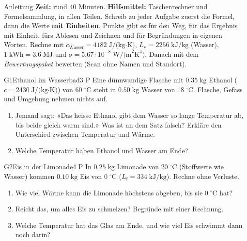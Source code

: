 \documentclass[11pt]{article}
\begin{document}

\begin{lpinfo}{Anleitung}
\textbf{Zeit:} rund 40 Minuten. \textbf{Hilfsmittel:} Taschenrechner und Formelsammlung, in allen Teilen.
Schreib zu jeder Aufgabe zuerst die Formel, dann die Werte \textbf{mit Einheiten}. Punkte gibt es für den Weg,
für das Ergebnis mit Einheit, fürs Ablesen und Zeichnen und für Begründungen in eigenen Worten. Rechne mit
\mbox{$c_\text{Wasser} = 4182\;\text{J/(kg·K)}$}, \mbox{$L_\text{v} = 2256\;\text{kJ/kg}$} (Wasser),
\mbox{$1\;\text{kWh} = 3.6\;\text{MJ}$} und \mbox{$\sigma = 5.67 \cdot 10^{-8}\;\text{W/(m}^2\text{K}^4)$}.
Danach mit dem \emph{Bewertungspaket} bewerten (Scan ohne Namen und Standort).
\end{lpinfo}


\begin{lpaufgabe}{G1}{Ethanol im Wasserbad}{3 P}
Eine dünnwandige Flasche mit \(0.35\;\text{kg}\) Ethanol (\(c = 2430\;\text{J/(kg·K)}\)) von \(60\;^\circ\text{C}\) steht in \(0.50\;\text{kg}\) Wasser von \(18\;^\circ\text{C}\). Flasche, Gefäss und Umgebung nehmen nichts auf.
\begin{enumerate}[label=\alph*),leftmargin=*,itemsep=2pt,topsep=2pt]
\item Jemand sagt: «Das heisse Ethanol gibt dem Wasser so lange Temperatur ab, bis beide gleich warm sind.» Was ist an dem Satz falsch? Erkläre den Unterschied zwischen Temperatur und Wärme.
\item Welche Temperatur haben Ethanol und Wasser am Ende?
\end{enumerate}
\end{lpaufgabe}

\begin{lpaufgabe}{G2}{Eis in der Limonade}{4 P}
In \(0.25\;\text{kg}\) Limonade von \(20\;^\circ\text{C}\) (Stoffwerte wie Wasser) kommen \(0.10\;\text{kg}\) Eis von \(0\;^\circ\text{C}\) (\mbox{\(L_\text{f} = 334\;\text{kJ/kg}\)}). Rechne ohne Verluste.
\begin{enumerate}[label=\alph*),leftmargin=*,itemsep=2pt,topsep=2pt]
\item Wie viel Wärme kann die Limonade höchstens abgeben, bis sie \(0\;^\circ\text{C}\) hat?
\item Reicht das, um alles Eis zu schmelzen? Begründe mit einer Rechnung.
\item Welche Temperatur hat das Glas am Ende, und wie viel Eis schwimmt dann noch darin?
\end{enumerate}
\end{lpaufgabe}
\end{document}
